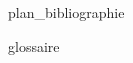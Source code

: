 


\label{refs}
{plan_bibliographie}

{glossaire}



\listoffigures

\listoftables

\listofcartes

\listofcodes